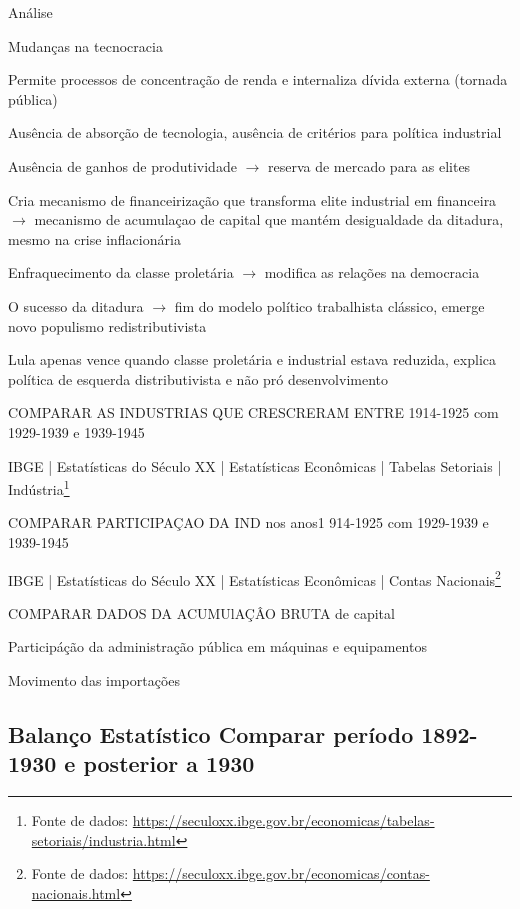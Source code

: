 \begin{esboco}
Análise

Mudanças na tecnocracia

Permite processos de concentração de renda e internaliza dívida externa
(tornada pública)

Ausência de absorção de tecnologia, ausência de critérios para política
industrial

Ausência de ganhos de produtividade $\rightarrow$ reserva de mercado para as elites

Cria mecanismo de financeirização que transforma elite industrial em
financeira $\rightarrow$ mecanismo de acumulaçao de capital que mantém desigualdade
da ditadura, mesmo na crise inflacionária

Enfraquecimento da classe proletária $\rightarrow$ modifica as relações na
democracia

O sucesso da ditadura $\rightarrow$ fim do modelo político trabalhista clássico,
emerge novo populismo redistributivista

Lula apenas vence quando classe proletária e industrial estava reduzida,
explica política de esquerda distributivista e não pró desenvolvimento

COMPARAR AS INDUSTRIAS QUE CRESCRERAM ENTRE 1914-1925 com 1929-1939 e
1939-1945

IBGE | Estatísticas do Século XX | Estatísticas Econômicas | Tabelas Setoriais | Indústria\footnote{Fonte de dados: \url{https://seculoxx.ibge.gov.br/economicas/tabelas-setoriais/industria.html}}

COMPARAR PARTICIPAÇAO DA IND nos anos1 914-1925 com 1929-1939 e
1939-1945

IBGE | Estatísticas do Século XX | Estatísticas Econômicas | Contas Nacionais\footnote{Fonte de dados: \url{https://seculoxx.ibge.gov.br/economicas/contas-nacionais.html}}

COMPARAR DADOS DA ACUMUlAÇÂO BRUTA de capital

Participáção da administração pública em máquinas e equipamentos

Movimento das importações
\end{esboco}

\subsection{Balanço Estatístico Comparar período 1892-1930 e posterior a 1930}\label{balanuxe7o-estatuxedstico-comparar-peruxedodo-1892-1930-e-posterior-a-1930}


